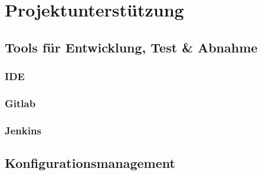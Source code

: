 \section{Projektunterstützung}
\subsection{Tools für Entwicklung, Test \& Abnahme}
\subsubsection{IDE}
\subsubsection{Gitlab}
\subsubsection{Jenkins}
\subsection{Konfigurationsmanagement}